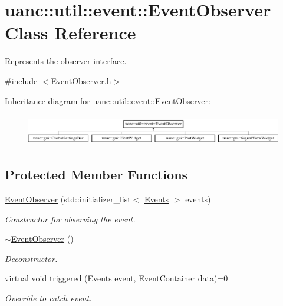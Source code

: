 \hypertarget{classuanc_1_1util_1_1event_1_1_event_observer}{}\section{uanc\+:\+:util\+:\+:event\+:\+:Event\+Observer Class Reference}
\label{classuanc_1_1util_1_1event_1_1_event_observer}


Represents the observer interface.  




{\ttfamily \#include $<$Event\+Observer.\+h$>$}

Inheritance diagram for uanc\+:\+:util\+:\+:event\+:\+:Event\+Observer\+:\begin{figure}[H]
\begin{center}
\leavevmode
\includegraphics[height=1.407035cm]{classuanc_1_1util_1_1event_1_1_event_observer}
\end{center}
\end{figure}
\subsection*{Protected Member Functions}
\begin{DoxyCompactItemize}
\item 
\hyperlink{classuanc_1_1util_1_1event_1_1_event_observer_a0b2188938471e358af093489db73c490}{Event\+Observer} (std\+::initializer\+\_\+list$<$ \hyperlink{namespaceuanc_1_1util_1_1event_a63f690675589114db9c6bcbe6f1088a4}{Events} $>$ events)
\begin{DoxyCompactList}\small\item\em Constructor for observing the event. \end{DoxyCompactList}\item 
\hyperlink{classuanc_1_1util_1_1event_1_1_event_observer_a026ac27f3295ed3d56b3f4d34af8c0bb}{$\sim$\+Event\+Observer} ()
\begin{DoxyCompactList}\small\item\em Deconstructor. \end{DoxyCompactList}\item 
virtual void \hyperlink{classuanc_1_1util_1_1event_1_1_event_observer_af1640e34db3379eaba8c817a92199807}{triggered} (\hyperlink{namespaceuanc_1_1util_1_1event_a63f690675589114db9c6bcbe6f1088a4}{Events} event, \hyperlink{classuanc_1_1util_1_1event_1_1_event_container}{Event\+Container} data)=0
\begin{DoxyCompactList}\small\item\em Override to catch event. \end{DoxyCompactList}\end{DoxyCompactItemize}
